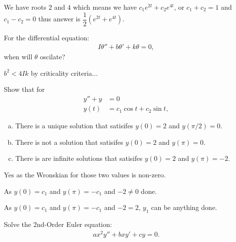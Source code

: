 \documentclass[11pt]{article}
\begin{document}
    \begin{solution}[Solution 2c]
        We have roots $2$ and $4$ which means we have $c_1e^{2t}+c_2e^{4t}$, or $c_1 + c_2 = 1$ and $c_1 - c_2=0$ thus answer is $\dfrac{1}{2} \left(e^{2t} + e^{4t}\right)$.
    \end{solution}
    \newpage
    \begin{problem}[Problem 3]
        For the differential equation:
        \begin{align}
            I\theta'' + b\theta' + k\theta = 0,
        \end{align}
        when will $\theta$ oscilate?
    \end{problem}
    \begin{solution}
        $b^2 < 4Ik$ by criticality criteria...
    \end{solution}
    \begin{problem}[Problem 4]
        Show that for 
        \begin{align}
            y'' + y &= 0 \\
            y(t) &= c_1 \cos t + c_2 \sin t,
        \end{align}
        \begin{enumerate}[(a)]
            \item There is a unique solution that satisifes $y(0) = 2$ and $y(\pi/2) = 0$.
            \item There is not a solution that satisifes $y(0) = 2$ and $y(\pi) = 0$.
            \item There is are infinite solutions that satisifes $y(0) = 2$ and $y(\pi) = -2$.
        \end{enumerate}
    \end{problem}
    \begin{solution}[Solution 4a]
        Yes as the Wronskian for those two values is non-zero.
    \end{solution}
    \begin{solution}[Solution 4b]
        As $y(0) = c_1$ and $y(\pi)=-c_1$ and $-2 \ne 0$ done.
    \end{solution}
    \begin{solution}[Solution 4c]
        As $y(0) = c_1$ and $y(\pi)=-c_1$ and $-2 = 2$, $y_1$ can be anything done.
    \end{solution} \newpage
    \begin{problem}[Problem 5]
        Solve the 2nd-Order Euler equation:
        \begin{align}
            ax^2y'' + bxy' + cy = 0.
        \end{align}
    \end{problem}
\end{document}
